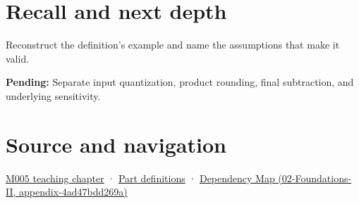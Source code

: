 \section{Recall and next depth}\label{appendix-a2773a6a2f9d-recall-and-next-depth}

Reconstruct the definition's example and name the assumptions that make it valid.

\textbf{Pending:} Separate input quantization, product rounding, final subtraction, and underlying sensitivity.

\section{Source and navigation}\label{appendix-a2773a6a2f9d-source-and-navigation}

\href{Continuous\%20Notes/Computing\%20Foundations\%20-\%20From\%20Bits\%20to\%20C++\%20and\%20Systems\%20APIs\#When\%20arithmetic\%20meets\%20uncertainty}{M005 teaching chapter} · \hyperref[appendix-fd090d982a15-m005---parts-77-88]{Part definitions} · \href{../02-Foundations-II/main.pdf\#nameddest=appendix-4ad47bdd269a}{Dependency Map (02-Foundations-II, appendix-4ad47bdd269a)}
